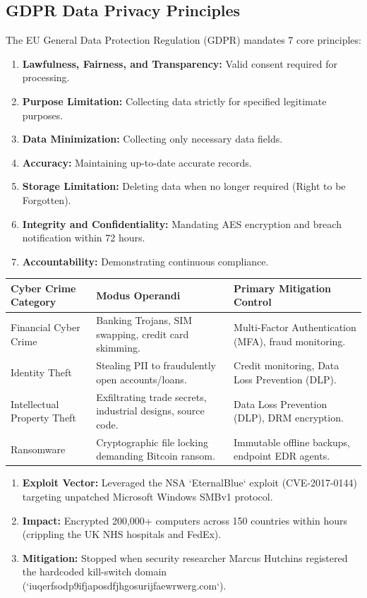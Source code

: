 \documentclass[12pt,a4paper]{article}
\renewcommand{\arraystretch}{1.45}
\begin{document}
\subsection{GDPR Data Privacy Principles}
The EU General Data Protection Regulation (GDPR) mandates 7 core principles:
\begin{enumerate}[leftmargin=*, itemsep=3pt]
  \item \textbf{Lawfulness, Fairness, and Transparency:} Valid consent required for processing.
  \item \textbf{Purpose Limitation:} Collecting data strictly for specified legitimate purposes.
  \item \textbf{Data Minimization:} Collecting only necessary data fields.
  \item \textbf{Accuracy:} Maintaining up-to-date accurate records.
  \item \textbf{Storage Limitation:} Deleting data when no longer required (Right to be Forgotten).
  \item \textbf{Integrity and Confidentiality:} Mandating AES encryption and breach notification within 72 hours.
  \item \textbf{Accountability:} Demonstrating continuous compliance.
\end{enumerate}

{\renewcommand{\arraystretch}{1.45}%
\begin{tabularx}{\linewidth}{|B{3.5cm}|Y|Y|}
\hline
\textbf{Cyber Crime Category} & \textbf{Modus Operandi} & \textbf{Primary Mitigation Control} \\
\hline
Financial Cyber Crime & Banking Trojans, SIM swapping, credit card skimming. & Multi-Factor Authentication (MFA), fraud monitoring. \\
\hline
Identity Theft & Stealing PII to fraudulently open accounts/loans. & Credit monitoring, Data Loss Prevention (DLP). \\
\hline
Intellectual Property Theft & Exfiltrating trade secrets, industrial designs, source code. & Data Loss Prevention (DLP), DRM encryption. \\
\hline
Ransomware & Cryptographic file locking demanding Bitcoin ransom. & Immutable offline backups, endpoint EDR agents. \\
\hline
\end{tabularx}}

\begin{tcolorbox}[examplebox, title={\textbf{Real-World Case Study: WannaCry Ransomware Pandemic (2017)}}]
\begin{enumerate}[leftmargin=*, itemsep=3pt]
  \item \textbf{Exploit Vector:} Leveraged the NSA `EternalBlue` exploit (CVE-2017-0144) targeting unpatched Microsoft Windows SMBv1 protocol.
  \item \textbf{Impact:} Encrypted 200,000+ computers across 150 countries within hours (crippling the UK NHS hospitals and FedEx).
  \item \textbf{Mitigation:} Stopped when security researcher Marcus Hutchins registered the hardcoded kill-switch domain (`iuqerfsodp9ifjaposdfjhgosurijfaewrwerg.com`).
\end{enumerate}
\end{tcolorbox}
\end{document}
